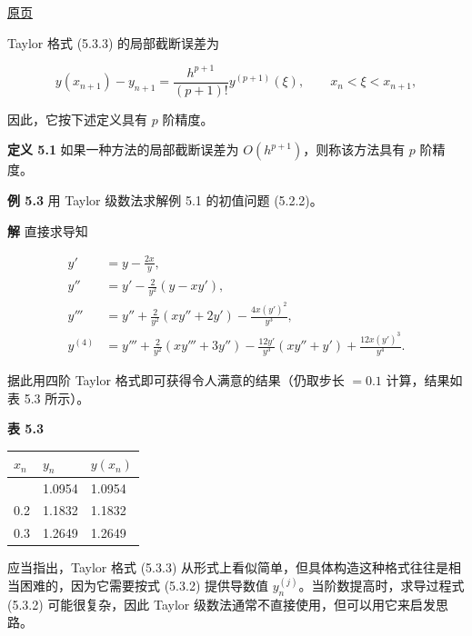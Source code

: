 \documentclass[
  10pt,
  fontset=fandol]{ctexart}
\newcounter{none} %
\begin{document}
\href{../../source-images/pdf-127.jpeg}{原页}

Taylor 格式 (5.3.3) 的局部截断误差为

\[
y(x_{n+1})-y_{n+1}=\frac{h^{p+1}}{(p+1)!}y^{(p+1)}(\xi),\qquad x_n<\xi<x_{n+1},
\]

因此，它按下述定义具有 \(p\) 阶精度。

\textbf{定义 5.1} 如果一种方法的局部截断误差为 \(O(h^{p+1})\)，则称该方法具有 \(p\) 阶精度。

\textbf{例 5.3} 用 Taylor 级数法求解例 5.1 的初值问题 (5.2.2)。

\textbf{解} 直接求导知

\[
\begin{aligned}
y'&=y-\frac{2x}{y},\\
y''&=y'-\frac{2}{y^2}(y-xy'),\\
y'''&=y''+\frac{2}{y^2}(xy''+2y')-\frac{4x(y')^2}{y^3},\\
y^{(4)}&=y'''+\frac{2}{y^2}(xy'''+3y'')-\frac{12y'}{y^3}(xy''+y')+\frac{12x(y')^3}{y^4}.
\end{aligned}
\]

据此用四阶 Taylor 格式即可获得令人满意的结果（仍取步长 \(=0.1\) 计算，结果如表 5.3 所示）。

\textbf{表 5.3}

{\def\LTcaptype{none} %
\begin{longtable}[]{@{}lll@{}}
\toprule\noalign{}
\(x_n\) & \(y_n\) & \(y(x_n)\) \\
\midrule\noalign{}
\endhead
\bottomrule\noalign{}
\endlastfoot
0.1 & 1.0954 & 1.0954 \\
0.2 & 1.1832 & 1.1832 \\
0.3 & 1.2649 & 1.2649 \\
\end{longtable}
}

应当指出，Taylor 格式 (5.3.3) 从形式上看似简单，但具体构造这种格式往往是相当困难的，因为它需要按式 (5.3.2) 提供导数值 \(y_n^{(j)}\)。当阶数提高时，求导过程式 (5.3.2) 可能很复杂，因此 Taylor 级数法通常不直接使用，但可以用它来启发思路。
\end{document}

